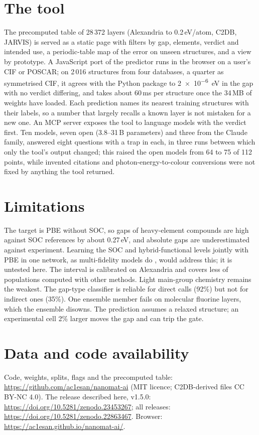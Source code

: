 \documentclass[11pt]{article}
\begin{document}
\section{The tool}\label{sec:tool}

The precomputed table of 28\,372 layers (Alexandria to 0.2\,eV/atom, C2DB, JARVIS) is
served as a static page with filters by gap, elements, verdict and intended use, a
periodic-table map of the error on unseen structures, and a view by prototype. A
JavaScript port of the predictor runs in the browser on a user's CIF or POSCAR; on
2\,016 structures from four databases, a quarter as symmetrised CIF, it agrees with the
Python package to \SI{2e-6}{eV} in the gap with no verdict differing, and takes about
60\,ms per structure once the 34\,MB of weights have loaded. Each prediction names its
nearest training structures with their labels, so a number that largely recalls a known
layer is not mistaken for a new one. An MCP server exposes the tool to language models
with the verdict first. Ten models, seven open (3.8--31\,B parameters) and three from
the Claude family, answered eight questions with a trap in each, in three runs between
which only the tool's output changed; this raised the open models from 64 to 75 of 112
points, while invented
citations and photon-energy-to-colour conversions were not fixed by anything the tool
returned.

\section{Limitations}

The target is PBE without SOC, so gaps of heavy-element compounds are high against SOC
references by about 0.27\,eV, and absolute gaps are underestimated against experiment.
Learning the SOC and hybrid-functional levels jointly with PBE in one network, as
multi-fidelity models do \citep{chen2021}, would address this; it is untested here.
The interval is calibrated on Alexandria and covers less of populations computed with
other methods. Light main-group chemistry remains the weakest. The gap-type classifier
is reliable for direct calls (92\%) but not for indirect ones (35\%). One ensemble member
fails on molecular fluorine layers, which the ensemble disowns. The prediction assumes
a relaxed structure; an experimental cell 2\% larger moves the gap and can trip the gate.

\section*{Data and code availability}

Code, weights, splits, flags and the precomputed table:
\url{https://github.com/ac1esan/nanomat-ai} (MIT licence; C2DB-derived files CC BY-NC
4.0). The release described here, v1.5.0:
\url{https://doi.org/10.5281/zenodo.23453267}; all releases:
\url{https://doi.org/10.5281/zenodo.22863467}. Browser:
\url{https://ac1esan.github.io/nanomat-ai/}.



\end{document}
